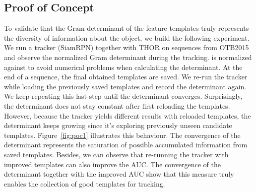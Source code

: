 \documentclass{article}
\begin{document}
\subsection{Proof of Concept} \label{sec:poc}
To validate that the Gram determinant of the feature templates truly represents the diversity of information about the object, we build the following experiment. We run a tracker (SiamRPN) together with THOR on sequences from OTB2015 and observe the normalized Gram determinant  during the tracking.  is normalized against  to avoid numerical problems when calculating the determinant. At the end of a sequence, the final obtained templates are saved. We re-run the tracker while loading the previously saved templates and record the determinant again. We keep repeating this last step until the determinant converges. Surprisingly, the determinant does not stay constant after first reloading the templates. However, because the tracker yields different results with reloaded templates, the determinant keeps growing since it's exploring previously unseen candidate templates. Figure~\ref{fig:poc1} illustrates this behaviour. The convergence of the determinant represents the saturation of possible accumulated information from saved templates. Besides, we can observe that re-running the tracker with improved templates can also improve the AUC. The convergence of the determinant together with the improved AUC show that this measure truly enables the collection of good templates for tracking.
\end{document}
